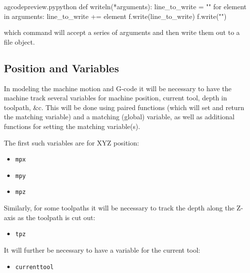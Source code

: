 \documentclass{ltxdoc}
\begin{document}
\lstset{firstnumber=\thegcpy}
\begin{writecode}{a}{gcodepreview.py}{python}
def writeln(*arguments):
    line_to_write = ""
    for element in arguments:
        line_to_write += element
    f.write(line_to_write)
    f.write("\n")
    
\end{writecode}
\addtocounter{gcpy}{7}

\noindent which command will accept a series of arguments and then write them out to a file 
object.

\subsection{Position and Variables}
 
In modeling the machine motion and G-code it will be necessary to have the machine track 
several variables for machine position, current tool, depth in toolpath, \&c. 
This will be done using paired functions (which will set and return the  
matching variable) and a matching (global) variable, as well as additional functions for 
setting the matching variable(s).

\begin{samepage}
The first such variables are for XYZ position:

\begin{itemize}
 \item \texttt{mpx} 
 \item \texttt{mpy} 
 \item \texttt{mpz} 
\end{itemize}
\end{samepage}

\begin{samepage}
\noindent Similarly, for some toolpaths it will be necessary to track the depth along the Z-axis
as the toolpath is cut out:
 
\begin{itemize}
 \item \texttt{tpz} 
\end{itemize}
\end{samepage}

\begin{samepage}
\noindent It will further be necessary to have a variable for the current tool:

\begin{itemize}
 \item \texttt{currenttool} 
\end{itemize}
\end{samepage}
\end{document}
